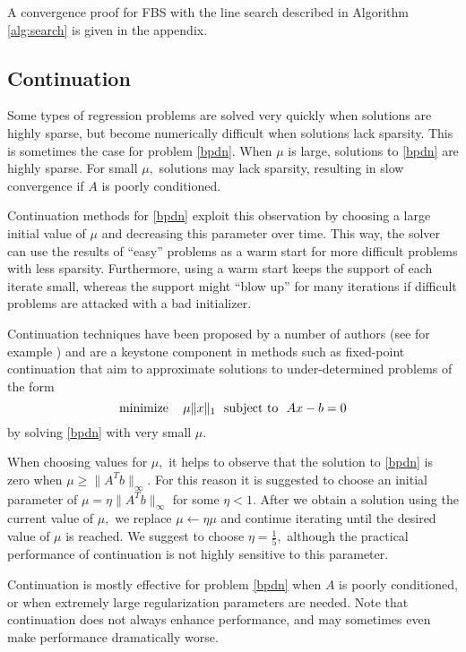 \documentclass{amsart}
\newcommand{\eqn}[2]{\begin{equation}\label{#1}#2\end{equation}}
\newcommand{\st}{\hbox{ \,\,subject to\,\, }}
\DeclareMathOperator*{\minimize}{minimize\quad}
\theoremstyle{definition}
\begin{document}
A convergence proof for FBS with the line search described in Algorithm \ref{alg:search} is given in the appendix.   

\subsection{Continuation}
Some types of regression problems are solved very quickly when solutions are highly sparse, but become numerically difficult when solutions lack sparsity. This is sometimes the case for problem \eqref{bpdn}.  When $\mu$ is large,  solutions to \eqref{bpdn} are highly sparse.  For small $\mu,$ solutions may lack sparsity, resulting in slow convergence if $A$ is poorly conditioned.

    Continuation methods for  \eqref{bpdn} exploit this observation by choosing a large initial value of $\mu$ and  decreasing this parameter over time.  This way, the solver can use the results of ``easy'' problems as a warm start for more difficult problems with less sparsity.   Furthermore, using a warm start keeps the support of each iterate small, whereas the support might ``blow up'' for many iterations if difficult problems are attacked with a bad initializer.   
    
    Continuation techniques have been proposed by a number of authors (see for example \cite{FNW07,BBC09}) and are a keystone component in methods such as fixed-point continuation \cite{HYY07} that aim to approximate solutions to under-determined problems of the form 
      \eqn{bpdn_eq}{
 \minimize  \mu \|x\|_1 \st    Ax-b = 0
}
by solving \eqref{bpdn} with very small $\mu.$
     
     When choosing values for $\mu,$ it helps to observe that the solution to \eqref{bpdn} is zero when $\mu\ge \|A^T b\|_\infty.$  For this reason it is suggested to choose an initial parameter of $\mu =  \eta \|A^T b\|_\infty$ for some $\eta<1.$  After we obtain a solution using the current value of $\mu,$ we replace $\mu \leftarrow \eta \mu$ and continue iterating until the desired value of $\mu$ is reached.  We suggest to choose $\eta = \frac{1}{5},$ although the practical performance of continuation is not highly sensitive to this parameter. 
     
     Continuation is mostly effective for problem \eqref{bpdn} when $A$ is poorly conditioned, or when extremely large regularization parameters are needed.  Note that continuation does not always enhance performance, and may sometimes even make performance dramatically worse.  
    
\end{document}
